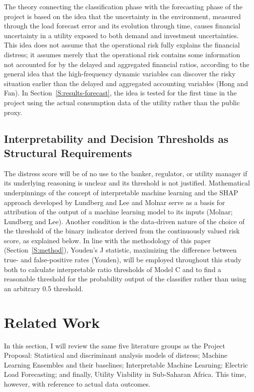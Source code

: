 \documentclass[final,1p,times]{elsarticle}
\begin{document}
The theory connecting the classification phase with the forecasting phase of the project is based on the idea that the uncertainty in the environment, measured through the load forecast error and its evolution through time, causes financial uncertainty in a utility exposed to both demand and investment uncertainties. This idea does not assume that the operational risk fully explains the financial distress; it assumes merely that the operational risk contains some information not accounted for by the delayed and aggregated financial ratios, according to the general idea that the high-frequency dynamic variables can discover the risky situation earlier than the delayed and aggregated accounting variables (Hong and Fan). In Section~\ref{S:results-forecast}, the idea is tested for the first time in the project using the actual consumption data of the utility rather than the public proxy.

\subsection{Interpretability and Decision Thresholds as Structural Requirements}

The distress score will be of no use to the banker, regulator, or utility manager if its underlying reasoning is unclear and its threshold is not justified. Mathematical underpinnings of the concept of interpretable machine learning and the SHAP approach developed by Lundberg and Lee and Molnar serve as a basis for attribution of the output of a machine learning model to its inputs (Molnar; Lundberg and Lee). Another condition is the data-driven nature of the choice of the threshold of the binary indicator derived from the continuously valued risk score, as explained below. In line with the methodology of this paper (Section~\ref{S:method}), Youden's J statistic, maximizing the difference between true- and false-positive rates (Youden), will be employed throughout this study both to calculate interpretable ratio thresholds of Model C and to find a reasonable threshold for the probability output of the classifier rather than using an arbitrary 0.5 threshold.

\section{Related Work}
\label{S:related}

In this section, I will review the same five literature groups as the Project Proposal: Statistical and discriminant analysis models of distress; Machine Learning Ensembles and their baselines; Interpretable Machine Learning; Electric Load Forecasting; and finally, Utility Viability in Sub-Saharan Africa. This time, however, with reference to actual data outcomes.
\end{document}

